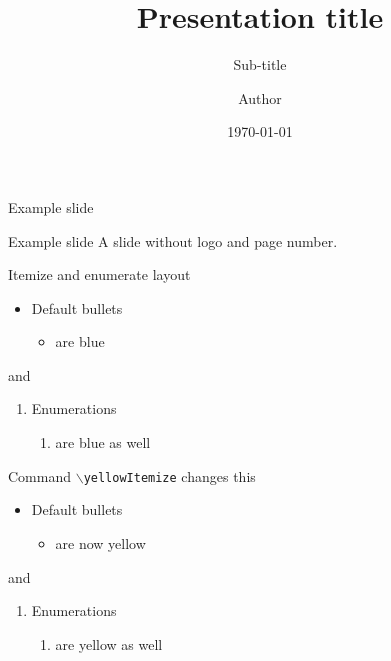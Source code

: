 \documentclass[aspectratio=169]{beamer}
\title{Presentation title}
\subtitle{Sub-title}
\author{Author}
\date{\today}
\begin{document}
\titlepage %




\begin{frame}{Example slide}

\end{frame}

\begin{frame}{Example slide}\thispagestyle{empty}
	A slide without logo and page number.
\end{frame}



\begin{frame}{Itemize and enumerate layout}
\begin{itemize}
	\item Default bullets
	\begin{itemize}
		\item are blue
	\end{itemize}
\end{itemize}
and
\begin{enumerate}
	\item Enumerations 
	\begin{enumerate}
		\item are blue as well
	\end{enumerate}
\end{enumerate}
Command \texttt{$\backslash$yellowItemize} changes this
\yellowItemize
\begin{itemize}
	\item Default bullets
	\begin{itemize}
		\item are now yellow
	\end{itemize}
\end{itemize}
and
\begin{enumerate}
	\item Enumerations 
	\begin{enumerate}
		\item are yellow as well
	\end{enumerate}
\end{enumerate}

\end{frame}
\end{document}
